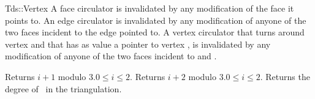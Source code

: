 \begin{ccClass}{Tds::Vertex}
A face circulator is invalidated by any modification of the face it
points to. An edge circulator is invalidated
by any modification of anyone of the two faces incident to the edge
pointed to.  A vertex circulator that turns around vertex 
and that has as value a pointer to vertex , is invalidated
by any modification of anyone of the two faces incident to 
and .

\ccGlue
{}
\ccGlue
{}
\ccGlue
{}

{Returns $i+1$ modulo 3.\ccPrecond $0\leq i \leq 2$.}
\ccGlue
{}
{Returns $i+2$ modulo 3.\ccPrecond $0\leq i \leq 2$.}
\ccGlue
{}
{Returns the degree of \ccVar\ in the triangulation.}

\end{ccClass}



